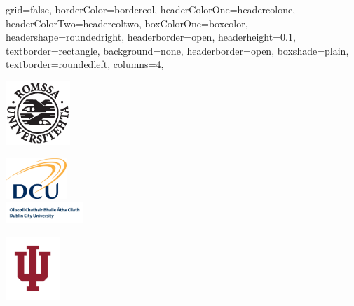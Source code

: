 \documentclass[fontscale=0.3,landscape,paperwidth=48in,paperheight=36in]{baposter}  %
\begin{document}
	\setlength{\pdfpageheight}{\paperheight}
	\setlength{\pdfpagewidth}{\paperwidth}


	\begin{poster}{
		grid=false,
		borderColor=bordercol,
		headerColorOne=headercolone,
		headerColorTwo=headercoltwo,
		boxColorOne=boxcolor,
		headershape=roundedright,
		headerborder=open,
		headerheight=0.1\textheight,
		textborder=rectangle,
		background=none,
		headerborder=open,
		boxshade=plain,
		textborder=roundedleft,
		columns=4,
	}{ %
		\includegraphics[height=6.5em]{uitlogo}
		\hspace{2cm}\begin{minipage}[t]{9em}
			\vspace{-2cm}
			\noindent\includegraphics[height=4.2em]{DCU_logo_2col}\\
			\vspace{-0.5ex}\hspace{0.105cm}\includegraphics[height=2.15em]{DCU_2010_Name_Mark_289}
			\end{minipage}
			\hspace{2cm}\includegraphics[height=6.5em]{iu_tab}
}
\end{poster}
\end{document}
